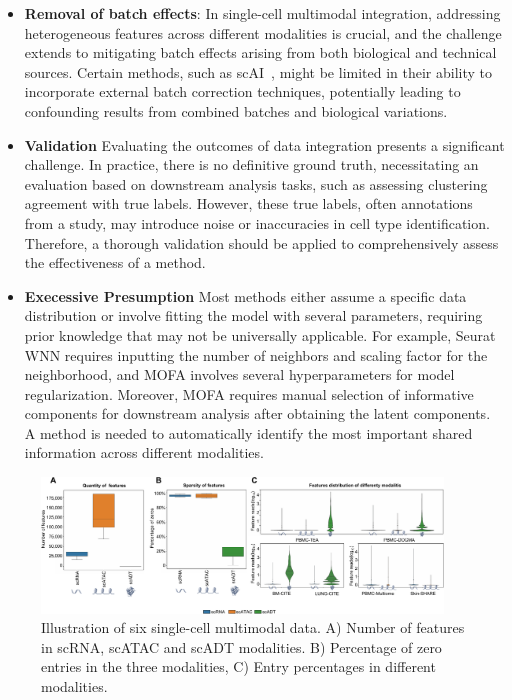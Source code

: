 \begin{itemize}
	\item \textbf{Removal of batch effects}:
	In single-cell multimodal integration, addressing heterogeneous features across different modalities is crucial, and the challenge extends to mitigating batch effects arising from both biological and technical sources. Certain methods, such as scAI~\citep{jin2020scai}, might be limited in their ability to incorporate external batch correction techniques, potentially leading to confounding results from combined batches and biological variations.

	\item \textbf{Validation}
	Evaluating the outcomes of data integration presents a significant challenge. In practice, there is no definitive ground truth, necessitating an evaluation based on downstream analysis tasks, such as assessing clustering agreement with true labels. However, these true labels, often annotations from a study, may introduce noise or inaccuracies in cell type identification. Therefore, a thorough validation should be applied to comprehensively assess the effectiveness of a method.

    \item \textbf{Execessive Presumption}
    Most methods either assume a specific data distribution or involve fitting the model with several parameters, requiring prior knowledge that may not be universally applicable. For example, Seurat WNN requires inputting the number of neighbors and scaling factor for the neighborhood, and MOFA involves several hyperparameters for model regularization. Moreover, MOFA requires manual selection of informative components for downstream analysis after obtaining the latent components. A method is needed to automatically identify the most important shared information across different modalities.

\end{itemize}

\begin{figure}[!ht]
	\centering
	\includegraphics[width=0.95\textwidth]{feature_statistic/fig}
	\vspace{0.1cm}
	\caption[features characteristics comparison showing the challenge of multimodal integration.]{Illustration of six single-cell multimodal data. A) Number of features in scRNA, scATAC and scADT modalities. B) Percentage of zero entries in the three modalities, C) Entry percentages in different modalities.}
	\label{fig:modalities_differences}
\end{figure}


